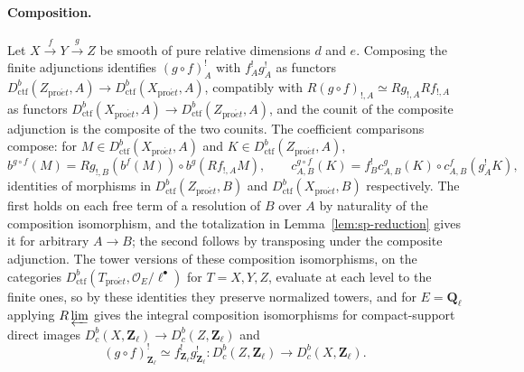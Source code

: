 \documentclass[11pt,a4paper]{article}
\numberwithin{equation}{section}
\theoremstyle{definition}
\theoremstyle{remark}
\newcommand{\Dbc}{D^b_c}
\newcommand{\Ql}{\mathbf Q_\ell}
\newcommand{\Zl}{\mathbf Z_\ell}
\newcommand{\proet}{\mathrm{pro}\acute{e}t}
\newcommand{\Dctf}{D^b_{\mathrm{ctf}}}
\begin{document}
\paragraph{Composition.}
Let $X\xrightarrow{f}Y\xrightarrow{g}Z$ be smooth of pure relative
dimensions $d$ and $e$. Composing the finite adjunctions identifies
$(g\circ f)_A^!$ with $f_A^!g_A^!$ as functors
$\Dctf(Z_{\proet},A)\to\Dctf(X_{\proet},A)$, compatibly with
$R(g\circ f)_{!,A}\simeq Rg_{!,A}Rf_{!,A}$ as functors
$\Dctf(X_{\proet},A)\to\Dctf(Z_{\proet},A)$, and the counit of the
composite adjunction is the composite of the two counits. The
coefficient comparisons compose: for $M\in\Dctf(X_{\proet},A)$ and
$K\in\Dctf(Z_{\proet},A)$,
\[
 b^{g\circ f}(M)=Rg_{!,B}(b^f(M))\circ b^g(Rf_{!,A}M),
 \qquad
 c^{g\circ f}_{A,B}(K)=f_B^!c^g_{A,B}(K)\circ c^f_{A,B}(g_A^!K),
\]
identities of morphisms in $\Dctf(Z_{\proet},B)$ and
$\Dctf(X_{\proet},B)$ respectively. The first holds on each free term of a resolution of $B$ over $A$ by
naturality of the composition isomorphism, and the totalization in
Lemma~\ref{lem:sp-reduction} gives it for arbitrary $A\to B$; the second
follows by transposing under the composite adjunction. The tower
versions of these composition isomorphisms, on the categories
$\Dctf(T_{\proet},\mathcal O_E/\ell^\bullet)$ for $T=X,Y,Z$, evaluate at each level to the
finite ones, so by these identities they preserve normalized towers, and
for $E=\Ql$ applying $R\varprojlim$ gives the integral composition
isomorphisms for compact-support direct images
$\Dbc(X,\Zl)\to\Dbc(Z,\Zl)$ and
\[
 (g\circ f)_{\Zl}^{!}\simeq f_{\Zl}^{!}g_{\Zl}^{!}
   :\Dbc(Z,\Zl)\longrightarrow\Dbc(X,\Zl).
\]
\end{document}
